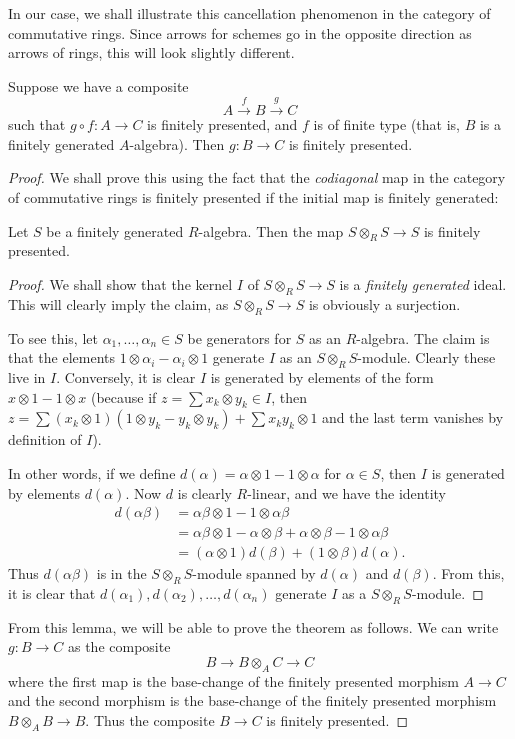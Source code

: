 In our case, we shall illustrate this cancellation phenomenon in the category
of commutative rings. Since arrows for schemes go in the opposite direction as
arrows of rings, this will look slightly different.

\begin{proposition} 
Suppose we have a composite
\[ A \stackrel{f}{\to} B \stackrel{g}{\to} C \]
such that $g \circ f: A \to C$ is finitely presented, and $f$ is of finite
type (that is, $B$ is a finitely generated $A$-algebra). Then  $g: B \to C$
is finitely presented.
\end{proposition} 
\begin{proof} 
We shall prove this using the fact that the \emph{codiagonal} map in the
category of commutative rings is finitely presented if the initial map is finitely generated:

\begin{lemma} 
Let $S$ be a finitely generated $R$-algebra. Then the map $S \otimes_R S \to
S$ is finitely presented.
\end{lemma} 
\begin{proof} 
We shall show that the kernel $I$ of $S \otimes_R S \to S$ is a \emph{finitely generated} ideal. This will
clearly imply the claim, as $S \otimes_R S \to S$ is obviously a surjection.

To see this, let $\alpha_1, \dots, \alpha_n \in S$ be generators for $S$ as an
$R$-algebra. The claim is that the elements $1 \otimes \alpha_i - \alpha_i
\otimes 1$ generate $I$ as an $S \otimes_R S$-module. 
Clearly these live in $I$. Conversely, it is clear $I$ is generated by
elements of the form $ x \otimes 1 - 1 \otimes x$ (because if $z=\sum x_k
\otimes y_k \in I$, then $z = \sum (x_k \otimes 1) \left(  1 \otimes y_k -  y_k
\otimes y_k \right) + \sum x_k y_k \otimes 1$ and the last term vanishes by
definition of $I$). 

In other words, if we define $d(\alpha) = \alpha \otimes 1 - 1 \otimes
\alpha$ for $\alpha \in S$, then $I$ is generated by elements $d(\alpha)$. 
Now $d$ is clearly $R$-linear, and  we have the identity
\begin{align*} d(\alpha \beta) & =  \alpha \beta \otimes 1 - 1 \otimes \alpha
\beta \\
&  = 
 \alpha \beta \otimes 1 - \alpha \otimes \beta + \alpha \otimes \beta -  1 \otimes \alpha
\beta \\
& = (\alpha \otimes 1) d(\beta) + (1 \otimes \beta) d(\alpha).
\end{align*}
Thus $d(\alpha \beta)$ is in the $S \otimes_R S$-module spanned by $d(\alpha)$
and $d(\beta)$.
From this, it is clear that $d(\alpha_1), d(\alpha_2), \dots, d(\alpha_n)$
generate $I$ as a $S \otimes_R S $-module.
\end{proof} 

From this lemma, we will be able to prove the theorem as follows.
We can write $g: B \to C$ as the composite
\[ B \to B \otimes_A C  \to C  \]
where the first map is the base-change of the finitely presented morphism $A
\to C$ and the second morphism is the base-change of the finitely presented
morphism $B \otimes_A B \to B$. Thus the composite $B \to C$ is finitely
presented.
\end{proof} 
